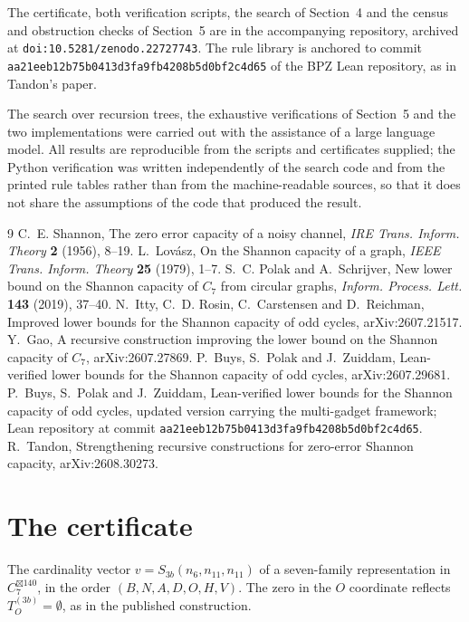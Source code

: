 \documentclass[11pt]{article}
\theoremstyle{definition}
\begin{document}
The certificate, both verification scripts, the search of Section~4 and the census and
obstruction checks of Section~5 are in the accompanying repository, archived at
\texttt{doi:10.5281/zenodo.22727743}. The rule library is anchored
to commit
\texttt{aa21eeb12b75b041}\allowbreak\texttt{3d3fa9fb4208b5d0bf2c4d65} of the BPZ Lean repository, as in Tandon's
paper.

The search over recursion trees, the exhaustive verifications of Section~5 and the two
implementations were carried out with the assistance of a large language model. All results are
reproducible from the scripts and certificates supplied; the Python verification was written
independently of the search code and from the printed rule tables rather than from the
machine-readable sources, so that it does not share the assumptions of the code that produced the
result.

\begin{thebibliography}{9}
 C.~E. Shannon, The zero error capacity of a noisy channel,
  \emph{IRE Trans. Inform. Theory} \textbf{2} (1956), 8--19.
 L.~Lov\'asz, On the Shannon capacity of a graph,
  \emph{IEEE Trans. Inform. Theory} \textbf{25} (1979), 1--7.
 S.~C. Polak and A.~Schrijver, New lower bound on the Shannon capacity of $C_7$ from
  circular graphs, \emph{Inform. Process. Lett.} \textbf{143} (2019), 37--40.
 N.~Itty, C.~D. Rosin, C.~Carstensen and D.~Reichman, Improved lower bounds for the
  Shannon capacity of odd cycles, arXiv:2607.21517.
 Y.~Gao, A recursive construction improving the lower bound on the Shannon capacity
  of $C_7$, arXiv:2607.27869.
 P.~Buys, S.~Polak and J.~Zuiddam, Lean-verified lower bounds for the Shannon
  capacity of odd cycles, arXiv:2607.29681.
 P.~Buys, S.~Polak and J.~Zuiddam, Lean-verified lower bounds for the Shannon
  capacity of odd cycles, updated version carrying the multi-gadget framework; Lean repository
  at commit \texttt{aa21eeb12b75b041}\allowbreak\texttt{3d3fa9fb4208b5d0bf2c4d65}.
 R.~Tandon, Strengthening recursive constructions for zero-error Shannon capacity,
  arXiv:2608.30273.
\end{thebibliography}

\appendix
\section{The certificate}

The cardinality vector $v = S_{3b}(n_6, n_{11}, n_{11})$ of a seven-family representation
in $C_7^{\boxtimes 140}$, in the order $(B,N,A,D,O,H,V)$. The zero in the $O$ coordinate
reflects $T^{(3b)}_O = \emptyset$, as in the published construction.
\end{document}
